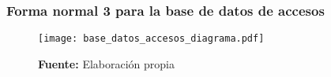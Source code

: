 \documentclass[../principal]{subfiles}
\begin{document}
  \subsubsection{Forma normal 3 para la base de datos de accesos}

  \begin{table}[H]
    \caption{Reducción a la Forma Normal 3 de la base de datos de accesos}
    \begin{subtable}{0.3\linewidth}
      \centering
      \caption{Tabla persona}
      
    \end{subtable}
    \begin{subtable}{0.7\linewidth}
      \centering
      \caption{Tabla puerta}
      
    \end{subtable}
    \begin{subtable}{0.4\linewidth}
      \centering
      \caption{Tabla acceso}
      
    \end{subtable}
    \begin{subtable}{0.6\linewidth}
      \centering
      \caption{Tabla permiso\_acceso}
      
    \end{subtable}
    \begin{subtable}{0.6\linewidth}
      \centering
      \caption{Tabla arduino}
      
    \end{subtable}
    \begin{subtable}{0.4\linewidth}
      \centering
      \caption{Tabla topico\_permiso}
      
    \end{subtable}
    \begin{subtable}{0.4\linewidth}
      \centering
      \caption{Tabla topico}
      
    \end{subtable}
    \begin{subtable}{0.6\linewidth}
      \centering
      \caption{Tabla cliente\_mqtt}
      
    \end{subtable}
    \caption*{\textbf{Fuente:} Elaboración propia}
    \label{tab:base_datos_accesos_fn3}
  \end{table}

  \begin{landscape}
    \begin{figure}[H]
      \centering
      \caption{Diagrama entidad-relación para la base de datos de control de accesos}
      \texttt{[image: base\_datos\_accesos\_diagrama.pdf]}
      \caption*{\textbf{Fuente:} Elaboración propia}
      \label{fig:base_datos_accesos_diagrama}
    \end{figure}
  \end{landscape}
\end{document}
